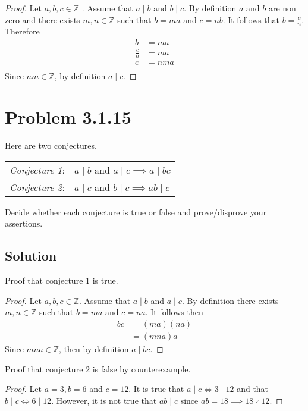 \documentclass[12pt]{extarticle}
\begin{document}
\begin{proof}
	Let $a,b,c \in \mathbb{Z}$ . Assume that $a\mid b$ and $b\mid c$. By definition $a$ and $b$ are non zero and there exists $m,n \in \mathbb{Z}$ such that $b = ma$ and $c = nb$. It follows that $b = \frac{c}{n}$. Therefore
	\begin{align*}
		b &= ma \\
		\frac{c}{n} &= ma \\
		c &= nma \\
	\end{align*}
	Since $nm \in \mathbb{Z}$, by definition $a \mid  c$.
\end{proof}

\section*{Problem 3.1.15}

Here are two conjectures. 
\begin{table}[h!]
	\centering
	\begin{tabular}{r l}
		\textit{Conjecture 1}: & $a \mid  b$ and $a \mid  c \implies a \mid  bc$ \\
		\textit{Conjecture 2}: & $a \mid  c$ and $b \mid  c \implies ab \mid  c $
	\end{tabular}
\end{table}
Decide whether each conjecture is true or false and prove/disprove your assertions.

\subsection*{Solution}


Proof that conjecture 1 is true.
\begin{proof}
	Let $a,b,c \in \mathbb{Z}$. Assume that $a \mid b$ and $a \mid c$. By definition there exists $m,n \in \mathbb{Z}$ such that $b = ma$ and $c = na$. It follows then 
	\begin{align*}
		bc &= (ma)(na) \\
			 &= (mna)a
	\end{align*}
	Since $mna \in \mathbb{Z}$, then by definition $a \mid bc$.
\end{proof}

Proof that conjecture 2 is false by counterexample.

\begin{proof}
	Let $a = 3, b = 6$ and $c=12$. It is true that $a\mid c \Longleftrightarrow 3 \mid  12$ and that $b\mid c \Longleftrightarrow 6\mid 12$. However, it is not true that $ab\mid c$ since $ab = 18 \implies 18 \nmid 12$.
\end{proof}

\end{document}

